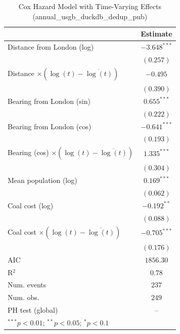 
\begin{table}
\begin{center}
\begin{tabular}{l c}
\hline
 & Estimate \\
\hline
Distance from London (log) & $-3.648^{***}$ \\
 & $(0.257)$ \\
Distance $\times (\log(t)-\overline{\log(t)})$ & $-0.495$ \\
 & $(0.390)$ \\
Bearing from London (sin) & $0.655^{***}$ \\
 & $(0.222)$ \\
Bearing from London (cos) & $-0.641^{***}$ \\
 & $(0.193)$ \\
Bearing (cos) $\times (\log(t)-\overline{\log(t)})$ & $1.335^{***}$ \\
 & $(0.304)$ \\
Mean population (log) & $0.169^{***}$ \\
 & $(0.062)$ \\
Coal cost (log) & $-0.192^{**}$ \\
 & $(0.088)$ \\
Coal cost $\times (\log(t)-\overline{\log(t)})$ & $-0.705^{***}$ \\
 & $(0.176)$ \\
\hline
AIC              & $1856.30$ \\
R$^2$            & $0.78$ \\
Num. events      & $237$ \\
Num. obs.        & $249$ \\
PH test (global) & -- \\
\hline
\multicolumn{2}{l}{\scriptsize{$^{***}p<0.01$; $^{**}p<0.05$; $^{*}p<0.1$}}
\end{tabular}
\caption{Cox Hazard Model with Time-Varying Effects (annual\_usgb\_duckdb\_dedup\_pub)}
\label{tab:cox_tv_annual_usgb_duckdb_dedup_pub}
\end{center}
\end{table}
